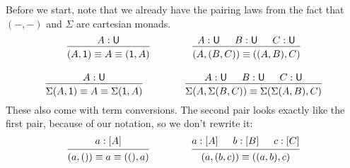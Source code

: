 \documentclass[11pt, one side, article]{memoir}
\theoremstyle{definition}
\theoremstyle{plain}
\newcommand{\tn}[1]{\textnormal{#1}}
\newcommand{\0}{\textsf{0}}
\newcommand{\1}{\tn{\textsf{1}}}
\newcommand{\U}{\tn{\textsf{U}}}
\begin{document}
Before we start, note that we already have the pairing laws from the fact that $(-,-)$ and $\Sigma$ are cartesian monads.
\begin{gather*}
\begin{prooftree}
	\Hypo{A:\U}
	\Infer1{(A,\1)\equiv A\equiv (\1,A)}
\end{prooftree}
\hspace{.6in}
\begin{prooftree}
	\Hypo{A:\U}
	\Hypo{B:\U}
	\Hypo{C:\U}
	\Infer3{(A,(B,C))\equiv ((A,B),C)}
\end{prooftree}
\\[10pt]
\begin{prooftree}
	\Hypo{A:\U}
	\Infer1{\Sigma(A,\1)\equiv A\equiv \Sigma(\1,A)}
\end{prooftree}
\hspace{.6in}
\begin{prooftree}
	\Hypo{A:\U}
	\Hypo{B:\U}
	\Hypo{C:\U}
	\Infer3{\Sigma(A,\Sigma(B,C))\equiv \Sigma(\Sigma(A,B),C)}
\end{prooftree}
\end{gather*}
These also come with term conversions. The second pair looks exactly like the first pair, because of our notation, so we don't rewrite it:
\begin{gather*}
\begin{prooftree}
	\Hypo{a:[A]}
	\Infer1{(a,())\equiv a\equiv ((),a)}
\end{prooftree}
\hspace{.6in}
\begin{prooftree}
	\Hypo{a:[A]}
	\Hypo{b:[B]}
	\Hypo{c:[C]}
	\Infer3{(a,(b,c))\equiv ((a,b),c)}
\end{prooftree}
\end{gather*}
\end{document}
